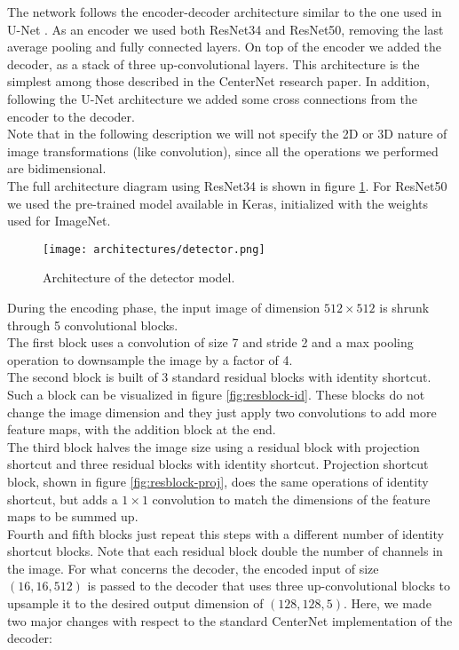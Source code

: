 \label{ssssec:networkarchitecturedet}

The network follows the encoder-decoder architecture similar to the one used in U-Net \cite{Ronneberger2015-tf}. As an encoder we used both ResNet34 \cite{deep-residual} and ResNet50, removing the last average pooling and fully connected layers. On top of the encoder we added the decoder, as a stack of three up-convolutional layers. This architecture is the simplest among those described in the CenterNet research paper. In addition, following the U-Net architecture we added some cross connections from the encoder to the decoder.\\
Note that in the following description we will not specify the 2D or 3D nature of image transformations (like convolution), since all the operations we performed are bidimensional.\\
The full architecture diagram using ResNet34 is shown in figure \ref{fig:detector}. For ResNet50 we used the pre-trained model available in Keras, initialized with the weights used for ImageNet.\\

\begin{figure}[h]
	\caption{Architecture of the detector model.}
	\centering
	\texttt{[image: architectures/detector.png]}
	\label{fig:detector}
\end{figure}

\noindent During the encoding phase, the input image of dimension $512 \times 512$ is shrunk through 5 convolutional blocks.\\
The first block uses a convolution of size 7 and stride 2 and a max pooling operation to downsample the image by a factor of 4.\\
The second block is built of 3 standard residual blocks with identity shortcut. Such a block can be visualized in figure \ref{fig:resblock-id}. These blocks do not change the image dimension and they just apply two convolutions to add more feature maps, with the addition block at the end.\\
The third block halves the image size using a residual block with projection shortcut and three residual blocks with identity shortcut. Projection shortcut block, shown in figure \ref{fig:resblock-proj}, does the same operations of identity shortcut, but adds a $1\times 1$ convolution to match the dimensions of the feature maps to be summed up.\\
Fourth and fifth blocks just repeat this steps with a different number of identity shortcut blocks. Note that each residual block double the number of channels in the image. For what concerns the decoder, the encoded input of size $(16, 16, 512)$ is passed to the decoder that uses three up-convolutional blocks to upsample it to the desired output dimension of $(128, 128, 5)$. Here, we made two major changes with respect to the standard CenterNet implementation of the decoder:

